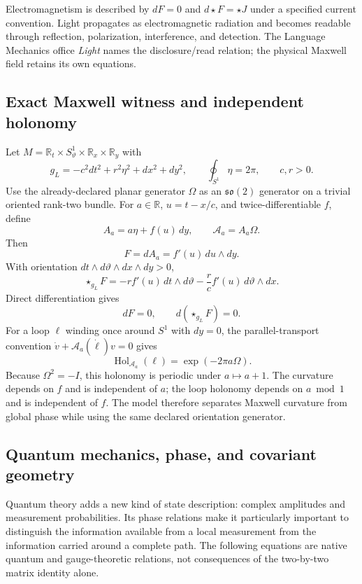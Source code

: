 \documentclass[10pt]{article}
\newcommand{\R}{\mathbb R}
\begin{document}
Electromagnetism is described by $dF=0$ and $d\star F=\star J$ under a specified current convention. Light propagates as electromagnetic radiation and becomes readable through reflection, polarization, interference, and detection. The Language Mechanics office \emph{Light} names the disclosure/read relation; the physical Maxwell field retains its own equations.

\subsection*{Exact Maxwell witness and independent holonomy}
Let
$M=\R_t\times S^1_\vartheta\times\R_x\times\R_y$ with
\begin{equation}
g_L=-c^2dt^2+r^2\eta^2+dx^2+dy^2,\qquad
\oint_{S^1}\eta=2\pi,\qquad c,r>0.
\end{equation}
Use the already-declared planar generator $\Omega$ as an $\mathfrak{so}(2)$ generator on a trivial oriented rank-two bundle. For $a\in\R$, $u=t-x/c$, and twice-differentiable $f$, define
\begin{equation}
A_a=a\eta+f(u)\,dy,\qquad \mathcal A_a=A_a\Omega.
\end{equation}
Then
\begin{equation}
\boxed{F=dA_a=f'(u)\,du\wedge dy.}
\end{equation}
With orientation $dt\wedge d\vartheta\wedge dx\wedge dy>0$,
\begin{equation}
\star_{g_L}F
=-rf'(u)\,dt\wedge d\vartheta
-\frac rc f'(u)\,d\vartheta\wedge dx.
\end{equation}
Direct differentiation gives
\begin{equation}
\boxed{dF=0,\qquad d(\star_{g_L}F)=0.}
\end{equation}
For a loop $\ell$ winding once around $S^1$ with $dy=0$, the parallel-transport convention $\dot v+\mathcal A_a(\dot\ell)v=0$ gives
\begin{equation}
\boxed{\operatorname{Hol}_{\mathcal A_a}(\ell)
=\exp(-2\pi a\Omega).}
\end{equation}
Because $\Omega^2=-I$, this holonomy is periodic under $a\mapsto a+1$. The curvature depends on $f$ and is independent of $a$; the loop holonomy depends on $a\bmod1$ and is independent of $f$. The model therefore separates Maxwell curvature from global phase while using the same declared orientation generator.


\subsection*{Quantum mechanics, phase, and covariant geometry}
Quantum theory adds a new kind of state description: complex amplitudes and measurement probabilities. Its phase relations make it particularly important to distinguish the information available from a local measurement from the information carried around a complete path. The following equations are native quantum and gauge-theoretic relations, not consequences of the two-by-two matrix identity alone.
\end{document}
